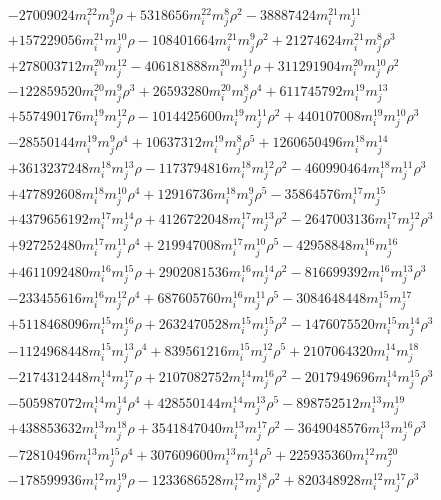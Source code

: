 {\begin{align*}
&-27009024m_i^{22}m_j^{9}\rho+5318656m_i^{22}m_j^{8}\rho^{2}-38887424m_i^{21}m_j^{11}\\
&+157229056m_i^{21}m_j^{10}\rho-108401664m_i^{21}m_j^{9}\rho^{2}+21274624m_i^{21}m_j^{8}\rho^{3}\\
&+278003712m_i^{20}m_j^{12}-406181888m_i^{20}m_j^{11}\rho+311291904m_i^{20}m_j^{10}\rho^{2}\\
&-122859520m_i^{20}m_j^{9}\rho^{3}+26593280m_i^{20}m_j^{8}\rho^{4}+611745792m_i^{19}m_j^{13}\\
&+557490176m_i^{19}m_j^{12}\rho-1014425600m_i^{19}m_j^{11}\rho^{2}+440107008m_i^{19}m_j^{10}\rho^{3}\\
&-28550144m_i^{19}m_j^{9}\rho^{4}+10637312m_i^{19}m_j^{8}\rho^{5}+1260650496m_i^{18}m_j^{14}\\
&+3613237248m_i^{18}m_j^{13}\rho-1173794816m_i^{18}m_j^{12}\rho^{2}-460990464m_i^{18}m_j^{11}\rho^{3}\\
&+477892608m_i^{18}m_j^{10}\rho^{4}+12916736m_i^{18}m_j^{9}\rho^{5}-35864576m_i^{17}m_j^{15}\\
&+4379656192m_i^{17}m_j^{14}\rho+4126722048m_i^{17}m_j^{13}\rho^{2}-2647003136m_i^{17}m_j^{12}\rho^{3}\\
&+927252480m_i^{17}m_j^{11}\rho^{4}+219947008m_i^{17}m_j^{10}\rho^{5}-42958848m_i^{16}m_j^{16}\\
&+4611092480m_i^{16}m_j^{15}\rho+2902081536m_i^{16}m_j^{14}\rho^{2}-816699392m_i^{16}m_j^{13}\rho^{3}\\
&-233455616m_i^{16}m_j^{12}\rho^{4}+687605760m_i^{16}m_j^{11}\rho^{5}-3084648448m_i^{15}m_j^{17}\\
&+5118468096m_i^{15}m_j^{16}\rho+2632470528m_i^{15}m_j^{15}\rho^{2}-1476075520m_i^{15}m_j^{14}\rho^{3}\\
&-1124968448m_i^{15}m_j^{13}\rho^{4}+839561216m_i^{15}m_j^{12}\rho^{5}+2107064320m_i^{14}m_j^{18}\\
&-2174312448m_i^{14}m_j^{17}\rho+2107082752m_i^{14}m_j^{16}\rho^{2}-2017949696m_i^{14}m_j^{15}\rho^{3}\\
&-505987072m_i^{14}m_j^{14}\rho^{4}+428550144m_i^{14}m_j^{13}\rho^{5}-898752512m_i^{13}m_j^{19}\\
&+438853632m_i^{13}m_j^{18}\rho+3541847040m_i^{13}m_j^{17}\rho^{2}-3649048576m_i^{13}m_j^{16}\rho^{3}\\
&-72810496m_i^{13}m_j^{15}\rho^{4}+307609600m_i^{13}m_j^{14}\rho^{5}+225935360m_i^{12}m_j^{20}\\
&-178599936m_i^{12}m_j^{19}\rho-1233686528m_i^{12}m_j^{18}\rho^{2}+820348928m_i^{12}m_j^{17}\rho^{3}\\

\end{align*}}
